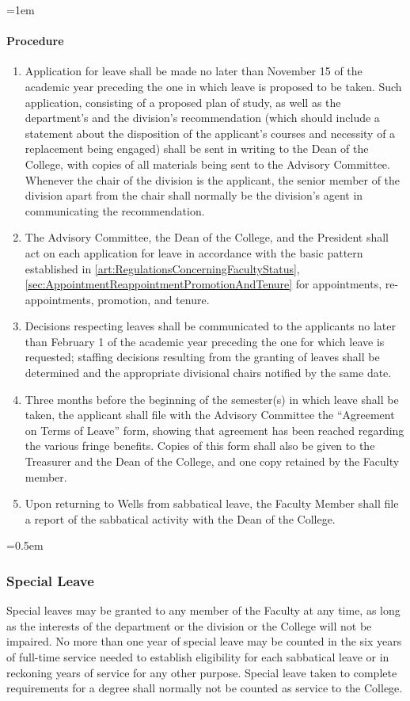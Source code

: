 \documentclass{manual}
\let\oldsubsubsection\subsubsection
\renewcommand\subsubsection{\leftskip=0.5em\oldsubsubsection}
\let\oldparagraph\paragraph
\renewcommand\paragraph{\leftskip=1em\oldparagraph}
\newcommand{\itemLevelA}{\alph*.}
\newcommand{\itemRefA}{\alph*}
\begin{document}
			\paragraph{Procedure}

				\begin{enumerate}[label=\itemLevelA,ref=\itemRefA]
				\item Application for leave shall be made no later than November 15 of the academic year preceding the one in which leave is proposed to be taken. Such application, consisting of a proposed plan of study, as well as the department's and the division's recommendation (which should include a statement about the disposition of the applicant's courses and necessity of a replacement being engaged) shall be sent in writing to the Dean of the College, with copies of all materials being sent to the Advisory Committee. Whenever the chair of the division is the applicant, the senior member of the division apart from the chair shall normally be the division's agent in communicating the recommendation.
				\item The Advisory Committee, the Dean of the College, and the President shall act on each application for leave in accordance with the basic pattern established in \cref{art:RegulationsConcerningFacultyStatus}, \cref{sec:AppointmentReappointmentPromotionAndTenure} for appointments, re-appointments, promotion, and tenure.
				\item Decisions respecting leaves shall be communicated to the applicants no later than February 1 of the academic year preceding the one for which leave is requested; staffing decisions resulting from the granting of leaves shall be determined and the appropriate divisional chairs notified by the same date.
				\item Three months before the beginning of the semester(s) in which leave shall be taken, the applicant shall file with the Advisory Committee the ``Agreement on Terms of Leave'' form, showing that agreement has been reached regarding the various fringe benefits. Copies of this form shall also be given to the Treasurer and the Dean of the College, and one copy retained by the Faculty member.
				\item Upon returning to Wells from sabbatical leave, the Faculty Member shall file a report of the sabbatical activity with the Dean of the College.
				\end{enumerate}

		\subsubsection{Special Leave}\label{sec:FacultyCommittees.B}
		Special leaves may be granted to any member of the Faculty at any time, as long as the interests of the department or the division or the College will not be impaired. No more than one year of special leave may be counted in the six years of full-time service needed to establish eligibility for each sabbatical leave or in reckoning years of service for any other purpose. Special leave taken to complete requirements for a degree shall normally not be counted as service to the College.
\end{document}
